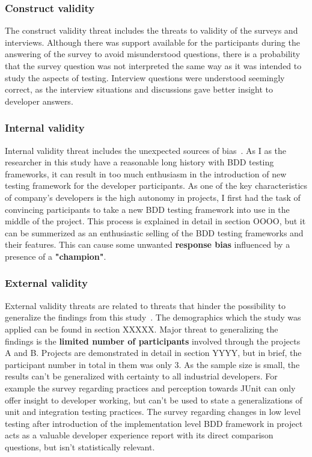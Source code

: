 \subsubsection{Construct validity}
The construct validity threat includes the threats to validity of the surveys and interviews. Although there was support available
for the participants during the answering of the survey to avoid misunderstood questions, there is a probability
that the survey question was not interpreted the same way as it was intended to study the aspects of testing. Interview questions
were understood seemingly correct, as the interview situations and discussions gave better insight to developer answers.
\subsubsection{Internal validity}
Internal validity threat includes the unexpected sources of bias~\cite{kitchenham2002preliminary}. As I as the researcher
in this study have a reasonable long history with BDD testing frameworks, it can result in too much enthusiasm in the introduction
of new testing framework for the developer participants. As one of the key characteristics of company's developers is the
high autonomy in projects, I first had the task of convincing participants to take a new BDD testing framework into use in the middle of the
project. This process is explained in detail in section OOOO, but it can be summerized as an enthusiastic selling of the
BDD testing frameworks and their features. This can cause some unwanted \textbf{response bias} influenced by a presence of a \textbf{"champion"}.
\subsubsection{External validity}
External validity threats are related to threats that hinder the possibility to generalize the findings from this study~\cite{runeson2012case}.
The demographics which the study was applied can be found in section XXXXX. Major threat to generalizing the findings
is the \textbf{limited number of participants} involved through the projects A and B. Projects are demonstrated in detail in section YYYY,
but in brief, the participant number in total in them was only 3. As the sample size is small, the results can't be generalized
with certainty to all industrial developers. For example the survey regarding practices and perception towards JUnit can
only offer insight to developer working, but can't be used to state a generalizations of unit and integration testing practices.
The survey regarding changes in low level testing after introduction of the implementation level BDD framework in project acts
as a valuable developer experience report with its direct comparison questions, but isn't statistically relevant.

